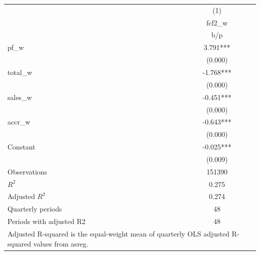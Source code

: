 {
\def\sym#1{\ifmmode^{#1}\else\(^{#1}\)\fi}
\begin{tabular}{l*{1}{c}}
\hline\hline
                    &\multicolumn{1}{c}{(1)}\\
                    &\multicolumn{1}{c}{fcf2\_w}\\
                    &         b/p   \\
\hline
pf\_w                &       3.791***\\
                    &     (0.000)   \\
total\_w             &      -1.768***\\
                    &     (0.000)   \\
sales\_w             &      -0.451***\\
                    &     (0.000)   \\
accr\_w              &      -0.643***\\
                    &     (0.000)   \\
Constant            &      -0.025***\\
                    &     (0.009)   \\
\hline
Observations        &      151390   \\
\(R^{2}\)           &       0.275   \\
Adjusted \(R^{2}\)  &       0.274   \\
Quarterly periods   &          48   \\
Periods with adjusted R2&          48   \\
\hline\hline
\multicolumn{2}{l}{\footnotesize Adjusted R-squared is the equal-weight mean of quarterly OLS adjusted R-squared values from asreg.}\\
\end{tabular}
}

